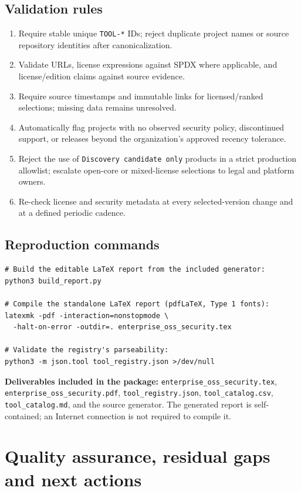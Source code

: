 \documentclass[11pt,oneside]{report}
\begin{document}
\section{Validation rules}
\begin{enumerate}[leftmargin=1.6em]
\item Require stable unique \texttt{TOOL-*} IDs; reject duplicate project names or source repository identities after canonicalization.
\item Validate URLs, license expressions against SPDX where applicable, and license/edition claims against source evidence.
\item Require source timestamps and immutable links for licensed/ranked selections; missing data remains unresolved.
\item Automatically flag projects with no observed security policy, discontinued support, or releases beyond the organization's approved recency tolerance.
\item Reject the use of \texttt{Discovery candidate only} products in a strict production allowlist; escalate open-core or mixed-license selections to legal and platform owners.
\item Re-check license and security metadata at every selected-version change and at a defined periodic cadence.
\end{enumerate}
\section{Reproduction commands}
\begin{verbatim}
# Build the editable LaTeX report from the included generator:
python3 build_report.py

# Compile the standalone LaTeX report (pdfLaTeX, Type 1 fonts):
latexmk -pdf -interaction=nonstopmode \
  -halt-on-error -outdir=. enterprise_oss_security.tex

# Validate the registry's parseability:
python3 -m json.tool tool_registry.json >/dev/null
\end{verbatim}
\textbf{Deliverables included in the package:} \nolinkurl{enterprise_oss_security.tex}, \nolinkurl{enterprise_oss_security.pdf}, \nolinkurl{tool_registry.json}, \nolinkurl{tool_catalog.csv}, \nolinkurl{tool_catalog.md}, and the source generator. The generated report is self-contained; an Internet connection is not required to compile it.

\chapter{Quality assurance, residual gaps and next actions}
\end{document}
